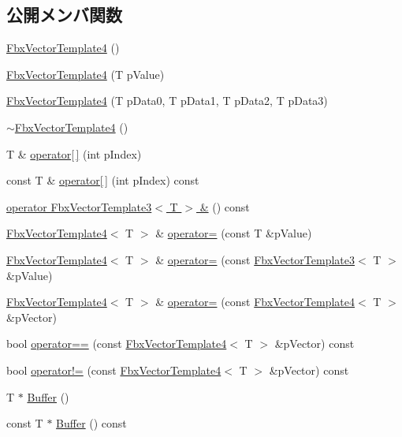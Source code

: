\subsection*{公開メンバ関数}
\begin{DoxyCompactItemize}
\item 
\hyperlink{class_fbx_vector_template4_a9ee2843b8c3a3755cc26392513172469}{Fbx\+Vector\+Template4} ()
\item 
\hyperlink{class_fbx_vector_template4_aeb22bf443f13a537bbb41950573ddf59}{Fbx\+Vector\+Template4} (T p\+Value)
\item 
\hyperlink{class_fbx_vector_template4_a57883ab7caddf4187c2bf1809633d6a4}{Fbx\+Vector\+Template4} (T p\+Data0, T p\+Data1, T p\+Data2, T p\+Data3)
\item 
\hyperlink{class_fbx_vector_template4_a2e1c4bee469fa94cacaaa7754c520b36}{$\sim$\+Fbx\+Vector\+Template4} ()
\item 
T \& \hyperlink{class_fbx_vector_template4_a133f80e779cc4abca9113611c1989f2f}{operator\mbox{[}$\,$\mbox{]}} (int p\+Index)
\item 
const T \& \hyperlink{class_fbx_vector_template4_ac4c8037ce6a79dc4687946edc4fb527f}{operator\mbox{[}$\,$\mbox{]}} (int p\+Index) const
\item 
\hyperlink{class_fbx_vector_template4_a7e7ab0b2ffa89ed3ed6efbb079661175}{operator Fbx\+Vector\+Template3$<$ T $>$ \&} () const
\item 
\hyperlink{class_fbx_vector_template4}{Fbx\+Vector\+Template4}$<$ T $>$ \& \hyperlink{class_fbx_vector_template4_a4cfd0c8e3412fff0ebd0b8f40865240e}{operator=} (const T \&p\+Value)
\item 
\hyperlink{class_fbx_vector_template4}{Fbx\+Vector\+Template4}$<$ T $>$ \& \hyperlink{class_fbx_vector_template4_aed4c70484a78794cf73ca8b0965f395c}{operator=} (const \hyperlink{class_fbx_vector_template3}{Fbx\+Vector\+Template3}$<$ T $>$ \&p\+Value)
\item 
\hyperlink{class_fbx_vector_template4}{Fbx\+Vector\+Template4}$<$ T $>$ \& \hyperlink{class_fbx_vector_template4_ac771b9e505496a28848da457b5fca667}{operator=} (const \hyperlink{class_fbx_vector_template4}{Fbx\+Vector\+Template4}$<$ T $>$ \&p\+Vector)
\item 
bool \hyperlink{class_fbx_vector_template4_aeb4b2a1987cef4f774dd1d0c0c4f7ca5}{operator==} (const \hyperlink{class_fbx_vector_template4}{Fbx\+Vector\+Template4}$<$ T $>$ \&p\+Vector) const
\item 
bool \hyperlink{class_fbx_vector_template4_aedbfa88c1a1e2870319ab4f2d775a40d}{operator!=} (const \hyperlink{class_fbx_vector_template4}{Fbx\+Vector\+Template4}$<$ T $>$ \&p\+Vector) const
\item 
T $\ast$ \hyperlink{class_fbx_vector_template4_a1ed89bb0b8aa35be8852863ff8e45b12}{Buffer} ()
\item 
const T $\ast$ \hyperlink{class_fbx_vector_template4_acba44ad0f935fc8917e4f01d113da317}{Buffer} () const
\end{DoxyCompactItemize}
